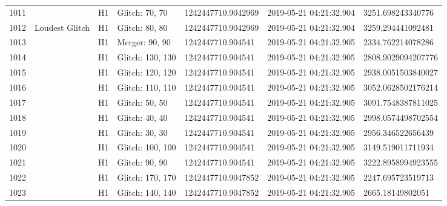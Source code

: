 \begin{longtable}{lllllll}
1011 &                                                    &       H1 &    Glitch: 70, 70 &  1242447710.9042969 &  2019-05-21 04:21:32.904 &   3251.698243340776 \\
1012 &                                     Loudest Glitch &       H1 &    Glitch: 80, 80 &  1242447710.9042969 &  2019-05-21 04:21:32.904 &   3259.294441092481 \\
1013 &                                                    &       H1 &    Merger: 90, 90 &   1242447710.904541 &  2019-05-21 04:21:32.905 &   2334.762214078286 \\
1014 &                                                    &       H1 &  Glitch: 130, 130 &   1242447710.904541 &  2019-05-21 04:21:32.905 &  2808.9029094207776 \\
1015 &                                                    &       H1 &  Glitch: 120, 120 &   1242447710.904541 &  2019-05-21 04:21:32.905 &  2938.0051503840027 \\
1016 &                                                    &       H1 &  Glitch: 110, 110 &   1242447710.904541 &  2019-05-21 04:21:32.905 &  3052.0628502176214 \\
1017 &                                                    &       H1 &    Glitch: 50, 50 &   1242447710.904541 &  2019-05-21 04:21:32.905 &  3091.7548387811025 \\
1018 &                                                    &       H1 &    Glitch: 40, 40 &   1242447710.904541 &  2019-05-21 04:21:32.905 &  2998.0574498702554 \\
1019 &                                                    &       H1 &    Glitch: 30, 30 &   1242447710.904541 &  2019-05-21 04:21:32.905 &   2956.346522656439 \\
1020 &                                                    &       H1 &  Glitch: 100, 100 &   1242447710.904541 &  2019-05-21 04:21:32.905 &   3149.519011711934 \\
1021 &                                                    &       H1 &    Glitch: 90, 90 &   1242447710.904541 &  2019-05-21 04:21:32.905 &  3222.8958994923555 \\
1022 &                                                    &       H1 &  Glitch: 170, 170 &  1242447710.9047852 &  2019-05-21 04:21:32.905 &   2247.695723519713 \\
1023 &                                                    &       H1 &  Glitch: 140, 140 &  1242447710.9047852 &  2019-05-21 04:21:32.905 &    2665.18149802051 \\

\end{longtable}
